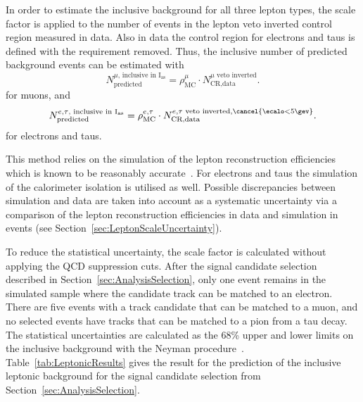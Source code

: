 In order to estimate the inclusive background for all three lepton types, the scale factor \leptonscalefactor is applied to the number of events in the lepton veto inverted control region measured in data.
Also in data the control region for electrons and taus is defined with the \ecalo requirement removed. 
Thus, the inclusive number of predicted background events can be estimated with  
\begin{equation*}
N^{\mu \text{, inclusive in I$_{\text{as}}$}}_{\text{predicted}} = \rho_{\text{MC}}^{\mu} \cdot N_{\text{CR,data}}^{\mu\text{ veto inverted}}.
\end{equation*}
for muons, and 
\begin{equation*}
N^{e,\tau\text{, inclusive in I$_{\text{as}}$}}_{\text{predicted}} = \rho_{\text{MC}}^{e,\tau} \cdot N_{\text{CR,data}}^{e,\tau\text{ veto inverted}, \cancel{\ecalo<5\gev}}.
\end{equation*}
for electrons and taus.

This method relies on the simulation of the lepton reconstruction efficiencies which is known to be reasonably accurate~\cite{bib:CMS:elec_recoEff,bib:CMS:muon_recoEff,bib:CMS:tau_recoEff}.
For electrons and taus the simulation of the calorimeter isolation is utilised as well.
Possible discrepancies between simulation and data are taken into account as a systematic uncertainty via a comparison of the lepton reconstruction efficiencies in data and simulation in \Zlep events (see Section~\ref{sec:LeptonScaleUncertainty}).

To reduce the statistical uncertainty, the scale factor is calculated without applying the QCD suppression cuts. 
After the signal candidate selection described in Section~\ref{sec:AnalysisSelection}, only one event remains in the simulated \WJets sample where the candidate track can be matched to an electron.
There are five events with a track candidate that can be matched to a muon, and no selected events have tracks that can be matched to a pion from a tau decay.
The statistical uncertainties are calculated as the 68\% upper and lower limits on the inclusive background with the Neyman procedure~\cite{bib:Neyman_1937,bib:PDG_2014}.
Table~\ref{tab:LeptonicResults} gives the result for the prediction of the inclusive leptonic background for the signal candidate selection from Section~\ref{sec:AnalysisSelection}.

